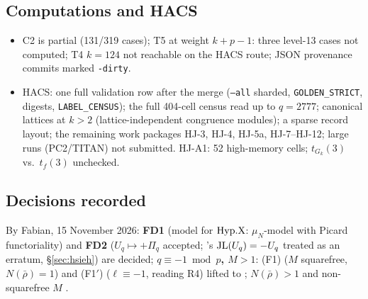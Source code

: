 \subsection{Computations and HACS}
\begin{itemize}
\item C2 is partial (131/319 cases); T5 at weight $k+p-1$: three level-13 cases not computed; T4 $k=124$ not reachable on
  the HACS route; JSON provenance commits marked \texttt{-dirty}.
\item HACS: one full validation row after the merge (\texttt{--all} sharded, \texttt{GOLDEN\_STRICT}, digests,
  \texttt{LABEL\_CENSUS}); the full 404-cell census read up to $q=2777$; canonical lattices at $k>2$ (lattice-independent
  congruence modules); a sparse record layout; the remaining work packages HJ-3, HJ-4, HJ-5a, HJ-7--HJ-12; large runs
  (PC2/TITAN) not submitted. HJ-A1: 52 high-memory cells; $t_{G_k}(3)$ vs.\ $t_f(3)$ unchecked.
\end{itemize}

\subsection{Decisions recorded}
By Fabian, 15 November 2026: \textbf{FD1} (model for $\mathrm{Hyp.X}$: $\mu_N$-model with Picard functoriality) and \textbf{FD2}
($U_q\mapsto+\Pi_q$ accepted; \cite{Hs}'s $\mathrm{JL}(U_q)=-U_q$ treated as an erratum, \S\ref{sec:hsieh}) are decided;
\textbf{$q\equiv-1\bmod p$, $M>1$}: (F1) ($M$ squarefree, $N(\bar\rho)=1$) and (F1$'$) ($\ell\equiv-1$, reading R4) lifted to
\stpmc; $N(\bar\rho)>1$ and non-squarefree $M$ \stopen.
